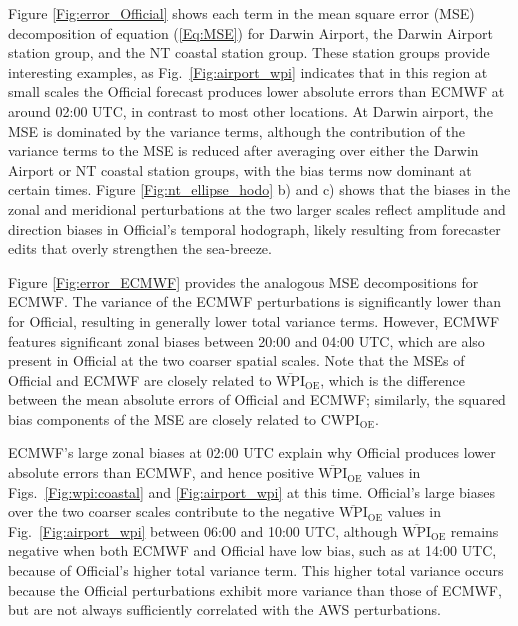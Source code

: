 \documentclass[twocol]{ametsoc}
\begin{document}
Figure \ref{Fig:error_Official} shows each term in the mean square error (MSE) decomposition of equation (\ref{Eq:MSE}) for Darwin Airport, the Darwin Airport station group, and the NT coastal station group. These station groups provide interesting examples, as Fig.~\ref{Fig:airport_wpi} indicates that in this region at small scales the Official forecast produces lower absolute errors than ECMWF at around 02:00 UTC, in contrast to most other locations. At Darwin airport, the MSE is dominated by the variance terms, although the contribution of the variance terms to the MSE is reduced after averaging over either the Darwin Airport or NT coastal station groups, with the bias terms now dominant at certain times. Figure \ref{Fig:nt_ellipse_hodo} b) and c) shows that the biases in the zonal and meridional perturbations at the two larger scales reflect amplitude and direction biases in Official's temporal hodograph, likely resulting from forecaster edits that overly strengthen the sea-breeze. 

Figure \ref{Fig:error_ECMWF} provides the analogous MSE decompositions for ECMWF. The variance of the ECMWF perturbations is significantly lower than for Official, resulting in generally lower total variance terms. However, ECMWF features significant zonal biases between 20:00 and 04:00 UTC, which are also present in Official at the two coarser spatial scales. Note that the MSEs of Official and ECMWF are closely related to $\overline{\text{WPI}}_\text{OE}$, which is the difference between the mean absolute errors of Official and ECMWF; similarly, the squared bias components of the MSE are closely related to $\text{CWPI}_\text{OE}$. 

ECMWF's large zonal biases at 02:00 UTC explain why Official produces lower absolute errors than ECMWF, and hence positive $\overline{\text{WPI}}_\text{OE}$ values in Figs.~\ref{Fig:wpi:coastal} and \ref{Fig:airport_wpi} at this time. Official's large biases over the two coarser scales contribute to the negative $\overline{\text{WPI}}_\text{OE}$ values in Fig.~\ref{Fig:airport_wpi} between 06:00 and 10:00 UTC, although $\overline{\text{WPI}}_\text{OE}$ remains negative when both ECMWF and Official have low bias, such as at 14:00 UTC, because of Official's higher total variance term. This higher total variance occurs because the Official perturbations exhibit more variance than those of ECMWF, but are not always sufficiently correlated with the AWS perturbations. 
\end{document}
